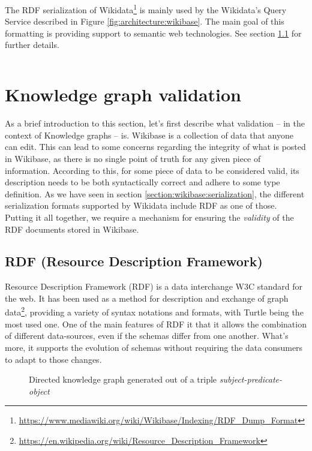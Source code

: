 The RDF serialization of Wikidata\footnote{\url{https://www.mediawiki.org/wiki/Wikibase/Indexing/RDF_Dump_Format}} is mainly used by the Wikidata's Query Service described in Figure \ref{fig:architecture:wikibase}. The main goal of this formatting is providing support to semantic web technologies. See section \ref{section:RDF} for further details.

\inputminted{turtle}{listings/serialization.rdf}

\section{Knowledge graph validation}

As a brief introduction to this section, let's first describe what validation -- in the context of Knowledge graphs -- is. Wikibase is a collection of data that anyone can edit. This can lead to some concerns regarding the integrity of what is posted in Wikibase, as there is no single point of truth for any given piece of information. According to this, for some piece of data to be considered valid, its description needs to be both syntactically correct and adhere to some type definition. As we have seen in section \ref{section:wikibase:serialization}, the different serialization formats supported by Wikidata include RDF as one of those. Putting it all together, we require a mechanism for ensuring the \textit{validity} of the RDF documents stored in Wikibase.

\subsection{RDF (Resource Description Framework)}
\label{section:RDF}

Resource Description Framework (RDF) is a data interchange W3C standard for the web. It has been used as a method for description and exchange of graph data\footnote{\url{https://en.wikipedia.org/wiki/Resource_Description_Framework}}, providing a variety of syntax notations and formats, with Turtle being the most used one. One of the main features of RDF it that it allows the combination of different data-sources, even if the schemas differ from one another. What's more, it supports the evolution of schemas without requiring the data consumers to adapt to those changes.

\begin{figure}[ht]
    \centering
    
    \caption{Directed knowledge graph generated out of a triple \textit{subject-predicate-object}}
    \label{fig:RDF}
\end{figure}

